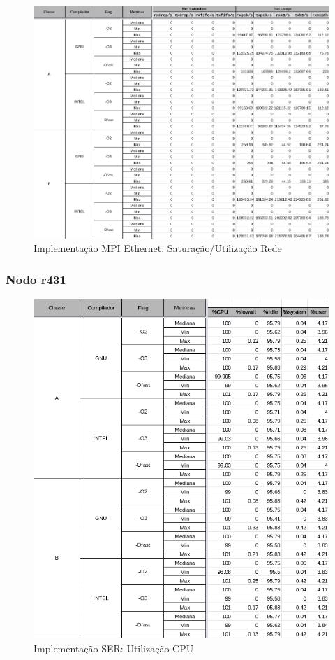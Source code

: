 \documentclass{article}
\begin{document}
\begin{appendices}
\begin{figure}[H]
    \centering
    \includegraphics[width=12cm]{Pictures/FT_r641_MPIE_NET.png}
    \caption{Implementação MPI Ethernet: Saturação/Utilização Rede}
    \label{figure:FT_r641_MPIE_NET}
\end{figure}

\subsubsection{Nodo r431}

\begin{figure}[H]
    \centering
    \includegraphics[width=12cm]{Pictures/FT_r431_SER_CPU.png}
    \caption{Implementação SER: Utilização CPU}
    \label{figure:FT_r431_SER_CPU}
\end{figure}


\end{appendices}
\end{document}
